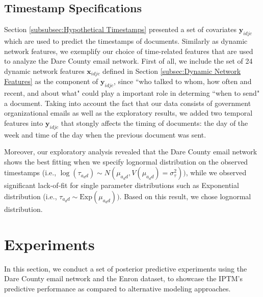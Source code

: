 \documentclass{article}
\begin{document}
\subsection{Timestamp Specifications}\label{subsec:Timestamp Specifications}
Section \ref{subsubsec:Hypothetical Timestamps} presented a set of covariates $\boldsymbol{y}_{idjc}$ which are used to predict the timestamps of documents. Similarly as dynamic network features, we exemplify our choice of time-related features that are used to analyze the Dare County email network. First of all, we include the set of 24 dynamic network features $\boldsymbol{x}_{idjc}$ defined in Section \ref{subsec:Dynamic Network Features} as the component of $\boldsymbol{y}_{idjc}$, since ``who talked to whom, how often and recent, and about what" could play a important role in determing ``when to send" a document. Taking into account the fact that our data consists of government organizational emails as well as the exploratory results, we added two temporal features into $\boldsymbol{y}_{idjc}$ that stongly affects the timing of documents: the day of the week and time of the day when the previous document was sent. 

Moreover, our exploratory analysis revealed that the Dare County email network shows the best fitting when we specify lognormal distribution on the observed timestamps (i.e., $\log(\tau_{a_dd}) \sim N(\mu_{a_d d}, V(\mu_{a_d d}) = \sigma^2_\tau))$, while we observed significant lack-of-fit for single parameter distributions such as Exponential distribution (i.e., $\tau_{a_dd} \sim \mbox{Exp}(\mu_{a_d d}))$. Based on this result, we chose lognormal distribution. 

\section{Experiments}\label{sec:Experiments}
In this section, we conduct a set of posterior predictive experiments using the Dare County email network and the Enron dataset, to showcase the IPTM's predictive performance as compared to alternative modeling approaches.
\end{document}
